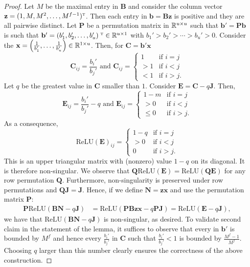 \begin{proof}
Let $M$ be the maximal entry in $\mathbf{B}$ and consider the column vector $\mathbf{z}=(1,M,M^2,\ldots,M^{f-1})^{\textsc{t}}$.
Then each entry in $\mathbf{b}=\mathbf{B}\mathbf{z}$ is positive and they are all pairwise distinct. 
Let $\mathbf{P}$ be a permutation matrix in $\mathbb{R}^{u\times u}$ such that $\mathbf{b}'=\mathbf{P}\mathbf{b}$ is such that  $\mathbf{b}'=(b_1',b_2',\ldots,b_u')^{\textsc{	t}}\in\mathbb{R}^{u\times 1}$ with $ b_1'> b_2'>\cdots > b_u'>0$. 
Consider the $\mathbf{x}=\left(\frac{1}{b_1'},\ldots,\frac{1}{b_u'}\right)\in \mathbb{R}^{1\times u}$. Then, for $\mathbf{C}=\mathbf{b}'\mathbf{x}$
$$
\mathbf{C}_{ij}=\frac{b_i'}{b_j'}  \text{ and } \mathbf{C}_{ij}=\begin{cases}  1 & \text{if $i=j$}\\
>1 & \text{if $i<j$}\\
< 1 & \text{if $i>j$}.
\end{cases}
$$
Let $q$ be the greatest value  in $\mathbf{C}$ smaller than $1$.
Consider $\mathbf{E}=\mathbf{C}- q\mathbf{J}$.
Then,
$$
\mathbf{E}_{ij}=\frac{b_i'}{b_j'}- q \text{ and } \mathbf{E}_{ij}=\begin{cases}  1-m & \text{if $i=j$} \\
> 0 & \text{if $i<j$}\\
\leq 0  & \text{if $i>j$}.
\end{cases}
$$
As a consequence,
$$
\text{ReLU}(\mathbf{E})_{ij}=\begin{cases}  1-q & \text{if $i=j$}\\
>0 & \text{if $i<j$}\\
0  & \text{if $i>j$}.
\end{cases}
$$
This is an upper triangular matrix with (nonzero) value $1-q$ on its diagonal. It is therefore non-singular. 
We observe that $\mathbf{Q}\text{ReLU}(\mathbf{E})=\text{ReLU}(\mathbf{Q}\mathbf{E})$ for any row permutation $\mathbf{Q}$. Furthermore, non-singularity is preserved under row permutations and $\mathbf{Q}\mathbf{J}=\mathbf{J}$. Hence, if we define $\mathbf{N}=\mathbf{z}\mathbf{x}$ and use the permutation matrix $\mathbf{P}$:
\begin{align*}
\mathbf{P}\text{ReLU}(\mathbf{B}\mathbf{N}-q\mathbf{J})&=
\text{ReLU}(\mathbf{P}\mathbf{B}\mathbf{z}\mathbf{x}-q\mathbf{P}\mathbf{J})=\text{ReLU}(\mathbf{E}-q\mathbf{J}),
\end{align*}
we have that $\text{ReLU}(\mathbf{B}\mathbf{N}-q\mathbf{J})$ is non-singular, as desired.
To validate second claim in the statement of the lemma, it suffices to observe that every
in $\mathbf{b'}$ is bounded by $M^f$ and hence every 
$\frac{b_i'}{b_j'}$ in $\mathbf{C}$ such that $\frac{b_i'}{b_j'}<1$ is bounded by
$\frac{M^f-1}{M^f}$. Choosing $q$ larger than this number clearly
ensures the correctness of the above construction.
\end{proof}

